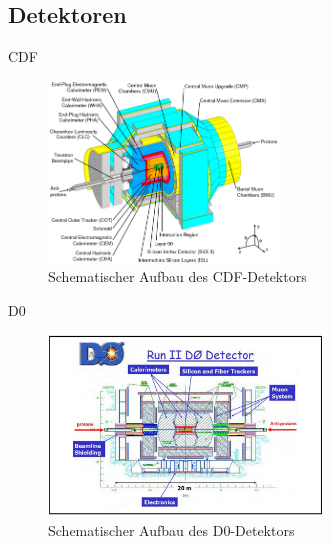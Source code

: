 \documentclass[aspectratio=1610, 9pt]{beamer}
\begin{document}
\subsection{Detektoren}


\begin{frame}{CDF}
    \begin{figure}
      \includegraphics[width=0.55\textwidth]{images/CDF.png}
      \caption{Schematischer Aufbau des CDF-Detektors \cite{CDF_aufbau}}
    \end{figure}
\end{frame}



\begin{frame}{D0}
  \begin{figure}
    \includegraphics[width=0.65\textwidth]{images/d0.jpg}
    \caption{Schematischer Aufbau des D0-Detektors \cite{D0}}
  \end{figure}
\end{frame}
\end{document}
